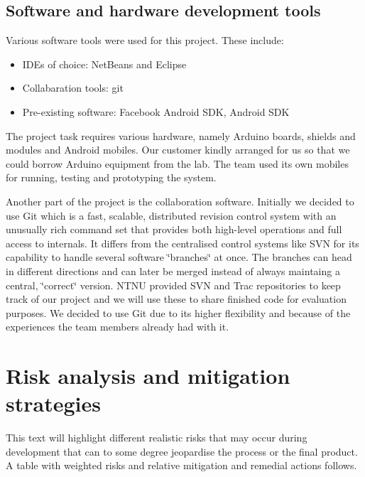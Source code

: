 \subsection{Software and hardware development tools}
Various software tools were used for this project.
These include:\newline
\begin{itemize}
	\item{IDEs of choice:} NetBeans and Eclipse\newline
	\item{Collabaration tools:} git\newline
	\item{Pre-existing software:} Facebook Android SDK, Android SDK\newline
\end{itemize}

The project task requires various hardware, namely Arduino boards, shields and modules and Android mobiles.
Our customer kindly arranged for us so that we could borrow Arduino equipment from the lab. The team used its own
mobiles for running, testing and prototyping the system.
	
Another part of the project is the collaboration software.
Initially we decided to use Git which is a fast, scalable,
distributed revision control system with an unusually rich command
set that provides both high-level operations and full access to internals.
It differs from the centralised control systems like SVN for its capability
to handle several software \char`\"{}branches\char`\"{} at once. The
branches can head in different directions and can later be merged
instead of always maintaing a central, \char`\"{}correct\char`\"{}
version. NTNU provided SVN and Trac repositories to keep track of our
project and we will use these to share finished code for evaluation
purposes. We decided to use Git due to its higher flexibility and because
of the experiences the team members already had with it.

\newpage
\section{Risk analysis and mitigation strategies}

This text will highlight different realistic risks that may occur during development
that can to some degree jeopardise the process or the final product.
A table with weighted risks and relative mitigation and remedial actions follows.

